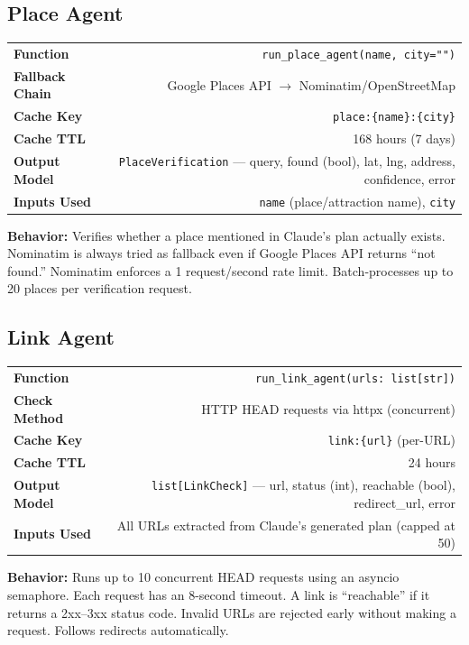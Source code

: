 \documentclass[11pt,a4paper]{article}
\begin{document}
\subsection{Place Agent}
\begin{infobox}
{\small
\begin{tabularx}{\textwidth}{@{}L{3cm}R@{}}
\textbf{Function}     & \texttt{run\_place\_agent(name, city="")} \\[3pt]
\textbf{Fallback Chain} & Google Places API $\to$ Nominatim/OpenStreetMap \\[3pt]
\textbf{Cache Key}     & \texttt{place:\{name\}:\{city\}} \\[3pt]
\textbf{Cache TTL}     & 168 hours (7 days) \\[3pt]
\textbf{Output Model}  & \texttt{PlaceVerification} --- query, found (bool), lat, lng, address, confidence, error \\[3pt]
\textbf{Inputs Used}   & \texttt{name} (place/attraction name), \texttt{city} \\
\end{tabularx}}

\textbf{Behavior:} Verifies whether a place mentioned in Claude's plan actually exists. Nominatim is always tried as fallback even if Google Places API returns ``not found.'' Nominatim enforces a 1 request/second rate limit. Batch-processes up to 20 places per verification request.
\end{infobox}

\subsection{Link Agent}
\begin{infobox}
{\small
\begin{tabularx}{\textwidth}{@{}L{3cm}R@{}}
\textbf{Function}     & \texttt{run\_link\_agent(urls: list[str])} \\[3pt]
\textbf{Check Method}  & HTTP HEAD requests via httpx (concurrent) \\[3pt]
\textbf{Cache Key}     & \texttt{link:\{url\}} (per-URL) \\[3pt]
\textbf{Cache TTL}     & 24 hours \\[3pt]
\textbf{Output Model}  & \texttt{list[LinkCheck]} --- url, status (int), reachable (bool), redirect\_url, error \\[3pt]
\textbf{Inputs Used}   & All URLs extracted from Claude's generated plan (capped at 50) \\
\end{tabularx}}

\textbf{Behavior:} Runs up to 10 concurrent HEAD requests using an asyncio semaphore. Each request has an 8-second timeout. A link is ``reachable'' if it returns a 2xx--3xx status code. Invalid URLs are rejected early without making a request. Follows redirects automatically.
\end{infobox}
\end{document}
